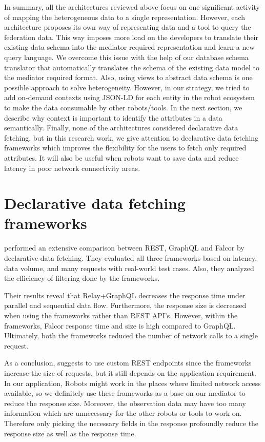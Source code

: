 	In summary, all the architectures reviewed above focus on one significant activity of mapping the heterogeneous data to a single representation. However, each architecture proposes its own way of representing data and a tool to query the federation data. This way imposes more load on the developers to translate their existing data schema into the mediator required representation and learn a new query language. We overcome this issue with the help of our database schema translator that automatically translates the schema of the existing data model to the mediator required format. Also,  using views to abstract data schema is one possible approach to solve heterogeneity. However, in our strategy, we tried to add on-demand contexts using JSON-LD for each entity in the robot ecosystem to make the data consumable by other robots/tools. In the next section, we describe why context is important to identify the attributes in a data semantically. Finally, none of the architectures considered declarative data fetching, but in this research work, we give attention to declarative data fetching frameworks which improves the flexibility for the users to fetch only required attributes. It will also be useful when robots want to save data and reduce latency in poor network connectivity areas.
	
	\section{Declarative data fetching frameworks}
	
	\citet{cederlund2016performance} performed an extensive comparison between REST, GraphQL and Falcor by declarative data fetching. They evaluated all three frameworks based on latency, data volume, and many requests with real-world test cases. Also, they analyzed the efficiency of filtering done by the frameworks.
	
	Their results reveal that Relay+GraphQL decreases the response time under parallel and sequential data flow. Furthermore, the response size is decreased when using the frameworks rather than REST API's. However, within the frameworks, Falcor response time and size is high compared to GraphQL. Ultimately, both the frameworks reduced the number of network calls to a single request.
	
	As a conclusion, \citet{cederlund2016performance} suggests to use custom REST endpoints since the frameworks increase the size of requests, but it still depends on the application requirement. In our application, Robots might work in the places where limited network access available, so we definitely use these frameworks as a base on our mediator to reduce the response size. Moreover, the observation data may have too many information which are unnecessary for the other robots or tools to work on. Therefore only picking the necessary fields in the response profoundly reduce the response size as well as the response time.

